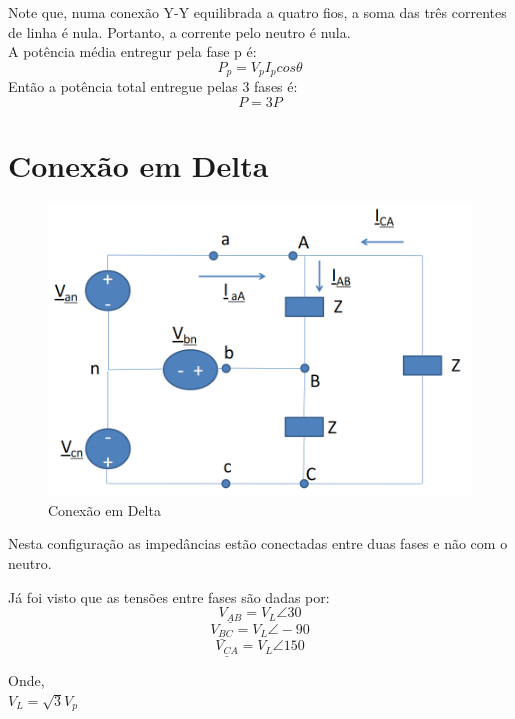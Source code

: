 \documentclass[a4paper, 12pt]{article}
\begin{document}
	Note que, numa conexão Y-Y equilibrada a quatro fios, a soma das três correntes de linha é nula. Portanto, a corrente pelo neutro é nula.\\
	
	A potência média entregur pela fase p é:
	\begin{equation}
		P_p = V_pI_p cos\theta
	\end{equation}
	Então a potência total entregue pelas 3 fases é:
	\begin{equation}
		P = 3P
	\end{equation}
	
\section{Conexão em Delta}
	\begin{figure}[h]
		\centering
		\includegraphics[scale=0.4]{a4.png}
		\caption{Conexão em Delta}
	\end{figure}
	\newpage
	Nesta configuração as impedâncias estão conectadas entre duas fases e não com o neutro.
	
	Já foi visto que as tensões entre fases são dadas por:
	\begin{equation}
		\underline{V_{AB}} = V_L \angle 30
	\end{equation}
	\begin{equation}
		\underline{V_{BC}} = V_L \angle -90
	\end{equation}
	\begin{equation}
		\underline{V_{CA}} = V_L \angle 150
	\end{equation}
	
	Onde,\\
	$V_L = \sqrt{3}V_p$\\
	
\end{document}
